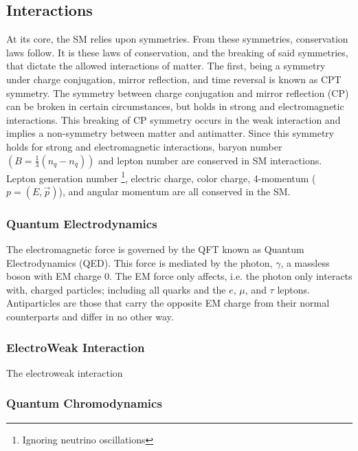 	\subsection{Interactions}\label{ssec:Interactions}

		At its core, the SM relies upon symmetries. From these symmetries, conservation laws follow. It is these laws of conservation, and the breaking of said symmetries,  that dictate the allowed interactions of matter. The first, being a symmetry under charge conjugation, mirror reflection, and time reversal is known as CPT symmetry. The symmetry between charge conjugation and mirror reflection (CP) can be broken in certain circumstances, but holds in strong and electromagnetic interactions. This breaking of CP symmetry occurs in the weak interaction and implies a non-symmetry between matter and antimatter. Since this symmetry holds for strong and electromagnetic interactions, baryon number $(B = \frac{1}{3}(n_{q} - n_{\bar{q}}) )$ and lepton number are conserved in SM interactions. Lepton generation number \footnote{Ignoring neutrino oscillations}, electric charge, color charge, 4-momentum ($p=(E,\vec{p})$), and angular momentum are all conserved in the SM.

		\subsubsection{Quantum Electrodynamics}\label{sssec:QED}

		The electromagnetic force is governed by the QFT known as Quantum Electrodynamics (QED). This force is mediated by the photon, $\gamma$, a massless boson with EM charge 0. The EM force only affects, i.e. the photon only interacts with, charged particles; including all quarks and the $e$, $\mu$, and $\tau$ leptons. Antiparticles are those that carry the opposite EM charge from their normal counterparts and differ in no other way.

		\subsubsection{ElectroWeak Interaction}\label{sssec:ElectroWeak}

		The electroweak interaction 

		\subsubsection{Quantum Chromodynamics}\label{sssec:QCD}
		
